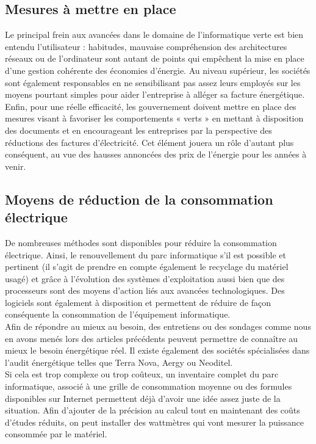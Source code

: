 \documentclass[a4paper,11pt,french]{article}
\begin{document}
\subsection{Mesures à mettre en place}
Le principal frein aux avancées dans le domaine de l’informatique verte est bien entendu l’utilisateur : habitudes, mauvaise compréhension des architectures réseaux ou de l’ordinateur sont autant de points qui empêchent la mise en place d’une gestion cohérente des économies d’énergie. Au niveau supérieur, les sociétés sont également responsables en ne sensibilisant pas assez leurs employés sur les moyens pourtant simples pour aider l’entreprise à alléger sa facture énergétique. Enfin, pour une réelle efficacité, les gouvernement doivent mettre en place des mesures visant à favoriser les comportements « verts » en mettant à disposition des documents et en encourageant les entreprises par la perspective des réductions des factures d’électricité. Cet élément jouera un rôle d’autant plus conséquent, au vue des hausses annoncées des prix de l’énergie pour les années à venir.\\

\subsection{Moyens de réduction de la consommation électrique}
De nombreuses méthodes sont disponibles pour réduire la consommation électrique. Ainsi, le renouvellement du parc informatique s’il est possible et pertinent (il s’agit de prendre en compte également le recyclage du matériel usagé) et grâce à l’évolution des systèmes d’exploitation aussi bien que des processeurs sont des moyens d’action liés aux avancées technologiques. Des logiciels sont également à disposition et permettent de réduire de façon conséquente la consommation de l’équipement informatique.\\

Afin de répondre au mieux au besoin, des entretiens ou des sondages comme nous en avons menés lors des articles précédents peuvent permettre de connaître au mieux le besoin énergétique réel. Il existe également des sociétés spécialisées dans l’audit énergétique telles que Terra Nova, Aergy ou Neoditel.\\

Si cela est trop complexe ou trop coûteux, un inventaire complet du parc informatique, associé à une grille de consommation moyenne ou des formules disponibles sur Internet permettent déjà d’avoir une idée assez juste de la situation. Afin d’ajouter de la précision au calcul tout en maintenant des coûts d’études réduits, on peut installer des wattmètres qui vont mesurer la puissance consommée par le matériel.\\
\end{document}
